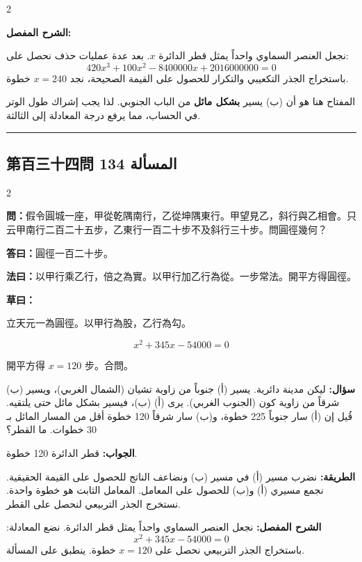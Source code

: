\documentclass[11pt,a4paper]{article}
\newcommand{\ar}[1]{\arabicfont\beginR #1\endR}
\newcommand{\arb}[1]{\textbf{\arabicfont\beginR #1\endR}}
\newcommand{\longline}{\noindent\rule{\textwidth}{0.4pt}}
\newcommand{\arnote}[1]{\textcolor{arabicblue}{\ar{#1}}}
\newcommand{\wen}[1]{\par\noindent\textbf{\textcolor{probcolor}{問：}}{#1}\par}
\newcommand{\da}[1]{\par\noindent\textbf{\textcolor{anscolor}{答曰：}}{#1}\par}
\newcommand{\fayue}[1]{\par\noindent\textbf{\textcolor{methodcolor}{法曰：}}{#1}\par}
\newcommand{\caoyue}[1]{\par\noindent\textbf{草曰：}{#1}\par}
\newcommand{\arwen}[1]{\par\noindent\arb{سؤال: }\arnote{#1}\par}
\newcommand{\arjwb}[1]{\par\noindent\arb{الجواب: }\arnote{#1}\par}
\newcommand{\arqwd}[1]{\par\noindent\arb{الطريقة: }\arnote{#1}\par}
\newcommand{\arshr}[1]{\par\noindent\arb{الشرح المفصل: }\arnote{#1}\par}
\begin{document}
\begin{paracol}{2}
\begin{rightcolumn}
\arshr{نجعل العنصر السماوي واحداً يمثل قطر الدائرة $x$. بعد عدة عمليات حذف نحصل على:
$$420x^3 + 100x^2 - 8400000x + 2016000000 = 0$$
باستخراج الجذر التكعيبي والتكرار للحصول على القيمة الصحيحة، نجد $x = 240$ خطوة.

المفتاح هنا هو أن (ب) يسير \textbf{بشكل مائل} من الباب الجنوبي. لذا يجب إشراك طول الوتر في الحساب، مما يرفع درجة المعادلة إلى الثالثة.}
\end{rightcolumn}

\end{paracol}

\vspace{0.3cm}
\longline

\subsection*{第百三十四問 \hfill \ar{المسألة 134}}

\begin{paracol}{2}

\begin{leftcolumn}
\wen{假令圓城一座，甲從乾隅南行，乙從坤隅東行。甲望見乙，斜行與乙相會。只云甲南行二百二十五步，乙東行一百二十步不及斜行三十步。問圓徑幾何？}

\da{圓徑一百二十步。}

\fayue{以甲行乘乙行，倍之為實。以甲行加乙行為從。一步常法。開平方得圓徑。}

\caoyue{
立天元一為圓徑。以甲行為股，乙行為勾。

$$x^2 + 345x - 54000 = 0$$

開平方得 $x = 120$ 步。合問。}
\end{leftcolumn}

\begin{rightcolumn}
\arwen{ليكن مدينة دائرية. يسير (أ) جنوباً من زاوية تشيان (الشمال الغربي)، ويسير (ب) شرقاً من زاوية كون (الجنوب الغربي). يرى (أ) (ب)، فيسير بشكل مائل حتى يلتقيه. قُيل إن (أ) سار جنوباً 225 خطوة، و(ب) سار شرقاً 120 خطوة أقل من المسار المائل بـ 30 خطوات. ما القطر؟}

\arjwb{قطر الدائرة 120 خطوة.}

\arqwd{نضرب مسير (أ) في مسير (ب) ونضاعف الناتج للحصول على القيمة الحقيقية. نجمع مسيري (أ) و(ب) للحصول على المعامل. المعامل الثابت هو خطوة واحدة. نستخرج الجذر التربيعي لنحصل على القطر.}

\arshr{نجعل العنصر السماوي واحداً يمثل قطر الدائرة. نضع المعادلة:
$$x^2 + 345x - 54000 = 0$$
باستخراج الجذر التربيعي نحصل على $x = 120$ خطوة. ينطبق على المسألة.}
\end{rightcolumn}

\end{paracol}
\end{document}
